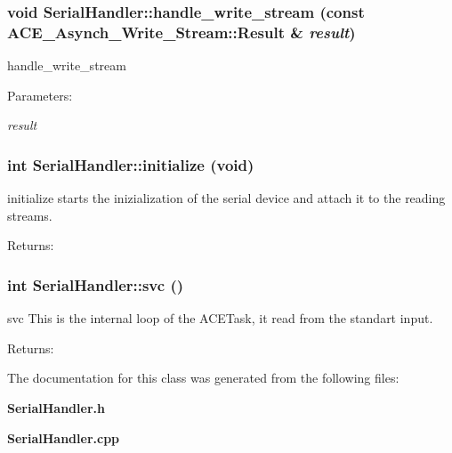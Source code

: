 \subsubsection{\setlength{\rightskip}{0pt plus 5cm}void Serial\-Handler::handle\_\-write\_\-stream (const ACE\_\-Asynch\_\-Write\_\-Stream::Result \& {\em result})\hspace{0.3cm}{\tt  [protected, virtual]}}\label{classSerialHandler_b1}


handle\_\-write\_\-stream

\begin{Desc}
\item[Parameters:]
\begin{description}
\item[{\em result}]\end{description}
\end{Desc}
\subsubsection{\setlength{\rightskip}{0pt plus 5cm}int Serial\-Handler::initialize (void)}\label{classSerialHandler_a2}


initialize starts the inizialization of the serial device and attach it to the reading streams.

\begin{Desc}
\item[Returns:]\end{Desc}
\subsubsection{\setlength{\rightskip}{0pt plus 5cm}int Serial\-Handler::svc ()\hspace{0.3cm}{\tt  [virtual]}}\label{classSerialHandler_a3}


svc This is the internal loop of the ACETask, it read from the standart input.

\begin{Desc}
\item[Returns:]\end{Desc}


The documentation for this class was generated from the following files:\begin{CompactItemize}
\item 
{\bf Serial\-Handler.h}\item 
{\bf Serial\-Handler.cpp}\end{CompactItemize}
